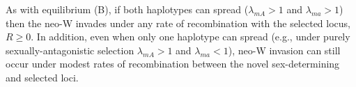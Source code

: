 \documentclass[12pt]{article}
\begin{document}
As with equilibrium (B), if both haplotypes can spread ($\lambda_{mA}>1$ and $\lambda_{ma}>1$) then the neo-W invades under any rate of recombination with the selected locus, $R\geq0$. 
In addition, even when only one haplotype can spread (e.g., under purely sexually-antagonistic selection $\lambda_{mA}>1$ and $\lambda_{ma}<1$), neo-W invasion can still occur under modest rates of recombination between the novel sex-determining and selected loci.

\end{document}
